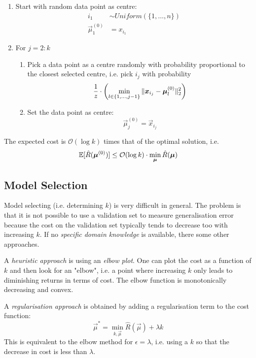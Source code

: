 \begin{enumerate}
	\item Start with random data point as centre:
	\begin{align*}
	i_1 &\sim Uniform(\{1, \dotsc, n\}) \\
	\vec{\mu}_1^{(0)} &= x_{i_1}
	\end{align*}
	
	\item For $j = 2 : k$
	\begin{enumerate}
		\item Pick a data point as a centre randomly
		with probability proportional to the closest
		selected centre, i.e. pick $i_j$ with probability
		\begin{equation*}
		\frac{1}{z} \cdot \left(
		\min_{l \in \{1, \dotsc, j - 1\}}{
			\lVert\boldsymbol{x}_{i_j} - \boldsymbol{\mu}_l^{(0)}\rVert_2^2
		}
		\right)
		\end{equation*}
		\item Set the data point as centre:
		\begin{equation*}
		\vec{\mu}_j^{(0)} = \vec{x}_{i_j}
		\end{equation*}
	\end{enumerate}
\end{enumerate}

The expected cost is $\mathcal{O}(\log k)$ times that
of the optimal solution, i.e.
\begin{equation*}
\mathbb{E}[\hat{R}(\boldsymbol{\mu}^{(0)})]
\leq \mathcal{O}(\log k) \cdot \min_{\boldsymbol{\mu}}{\hat{R}(\boldsymbol{\mu})}
\end{equation*}


\subsection{Model Selection}
Model selecting (i.e. determining $k$)
is very difficult in general.
The problem is that it is not possible to use a validation
set to measure generalisation error because
the cost on the validation set typically tends to decrease
too with increasing $k$.
If no \emph{specific domain knowledge} is available,
there some other approaches.

A \emph{heuristic approach} is using an \emph{elbow plot}.
One can plot the cost as a function of $k$ and then
look for an "elbow",
i.e. a point where increasing $k$ only leads to
diminishing returns in terms of cost.
The elbow function is monotonically decreasing and convex.

A \emph{regularisation approach} is obtained by adding
a regularisation term to the cost function:
\begin{equation*}
\vec{\mu}^* = \min_{k, \vec{\mu}}{
	\hat{R}(\vec{\mu}) + \lambda k
}
\end{equation*}
This is equivalent to the elbow method for
$\epsilon = \lambda$,
i.e. using a $k$ so that the decrease in cost is
less than $\lambda$.


